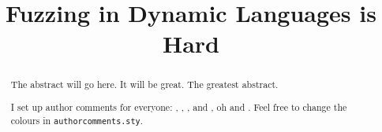 \documentclass[sigconf,review,anonymous]{acmart}
\begin{document}
\title{Fuzzing in Dynamic Languages is Hard}

\begin{abstract}
The abstract will go here.
It will be great.
The greatest abstract.

I set up author comments for everyone: , , , and , oh and .
Feel free to change the colours in {\tt authorcomments.sty}.
\end{abstract}

\maketitle













\end{document}
